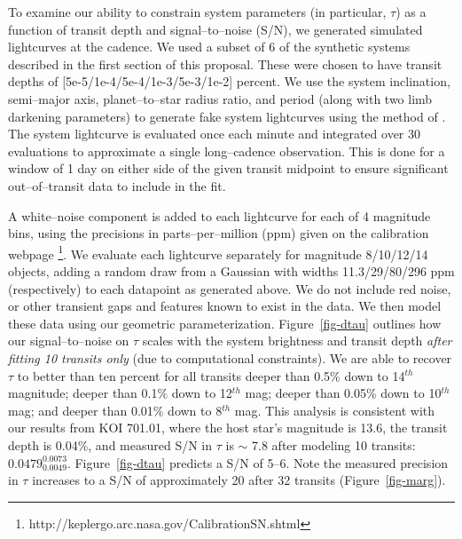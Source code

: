 \medskip
{\centerline{}}
\smallskip

To examine our ability to constrain system parameters (in
particular, $\tau$) as a function of transit depth and
signal--to--noise (S/N), we generated simulated lightcurves at
the \kepler cadence.  We used a subset of 6 of the synthetic systems
described in the first section of this proposal.  These were chosen to
have transit depths of [5e-5/1e-4/5e-4/1e-3/5e-3/1e-2] percent.  We
use the system inclination, semi--major axis, planet--to--star radius
ratio, and period (along with two limb darkening parameters) to
generate fake system lightcurves using the method of
\cite{2002ApJ...580L.171M}.  The system lightcurve is evaluated once
each minute and integrated over 30 evaluations to approximate a single
\kepler long--cadence observation.  This is done for a window of 1 day
on either side of the given transit midpoint to ensure significant
out--of--transit data to include in the fit.

A white--noise component is added to each lightcurve for each of 4
magnitude bins, using the precisions in parts--per--million (ppm)
given on the \kepler calibration
webpage \footnote{http://keplergo.arc.nasa.gov/CalibrationSN.shtml}.
We evaluate each lightcurve separately for magnitude 8/10/12/14
objects, adding a random draw from a Gaussian with widths
11.3/29/80/296 ppm (respectively) to each datapoint as generated
above.  We do not include red noise, or other transient gaps and
features known to exist in the \kepler data.  We then model these data
using our geometric parameterization.  Figure~\ref{fig-dtau} outlines
how our signal--to--noise on $\tau$ scales with the system brightness
and transit depth {\it after fitting 10 transits only} (due to
computational constraints).  We are able to recover $\tau$ to better
than ten percent for all transits deeper than 0.5\% down to 14$^{th}$
magnitude; deeper than 0.1\% down to 12$^{th}$ mag; deeper than 0.05\%
down to 10$^{th}$ mag; and deeper than 0.01\% down to 8$^{th}$ mag.
This analysis is consistent with our results from KOI 701.01, where
the host star's magnitude is 13.6, the transit depth is 0.04\%, and
measured S/N in $\tau$ is $\sim$ 7.8 after modeling 10 transits:
$0.0479_{0.0049}^{0.0073}$.  Figure~\ref{fig-dtau} predicts a S/N of
5--6.  Note the measured precision in $\tau$ increases to a S/N of
approximately 20 after 32 transits (Figure~\ref{fig-marg}).

